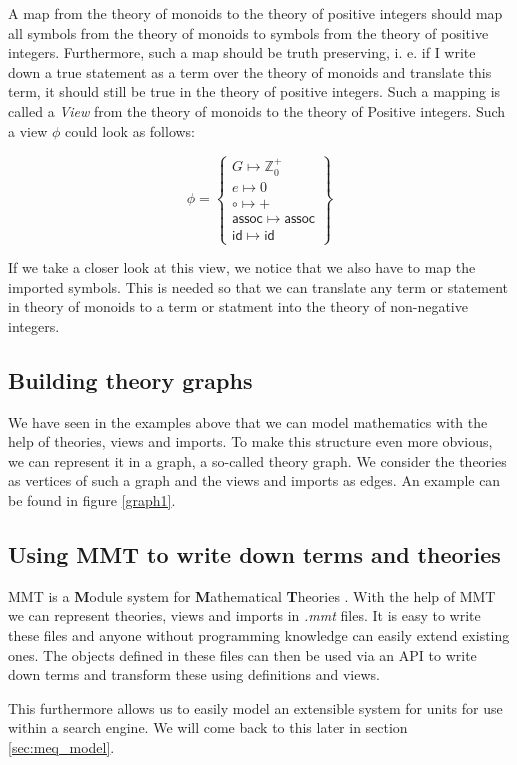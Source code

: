 \vspace{20px}

A map from the theory of monoids to the theory of positive integers should map all symbols from the theory of monoids to symbols from the theory of positive integers. Furthermore, such a map should be truth preserving, i. e. if I write down a true statement as a term over the theory of monoids and translate this term, it should still be true  in the theory of positive integers. Such a mapping is called a \textit{View} from the theory of monoids to the theory of Positive integers. Such a view $\phi$ could look as follows:

\[
  \phi=\left\{\begin{array}{l}
  G \mapsto \mathbb{Z}^{+}_{0}\\
  e \mapsto 0\\
  \circ \mapsto +\\
  \mathsf{assoc} \mapsto \mathsf{assoc}\\
  \mathsf{id} \mapsto \mathsf{id}
  \end{array}\right\}
\]

If we take a closer look at this view, we notice that we also have to map the imported symbols. This is needed so that we can translate any term or statement in theory of monoids to a term or statment into the theory of non-negative integers.

\subsection{Building theory graphs}

 We have seen in the examples above that we can model mathematics with the help of theories, views and imports. To make this structure even more obvious, we can represent it in a graph, a so-called theory graph. We consider the theories as vertices of such a graph and the views and imports as edges. An example can be found in figure \ref{graph1}.



\subsection{Using MMT to write down terms and theories}

MMT is a \textbf{M}odule system for \textbf{M}athematical \textbf{T}heories \cite{RabKoh:WSMSML13}. With the help of MMT we can represent theories, views and imports in \textit{.mmt} files. It is easy to write these files and anyone without programming knowledge can easily extend existing ones. The objects defined in these files can then be used via an API to write down terms and transform these using definitions and views.

This furthermore allows us to easily model an extensible system for units for use within a search engine. We will come back to this later in section \ref{sec:meq_model}.
